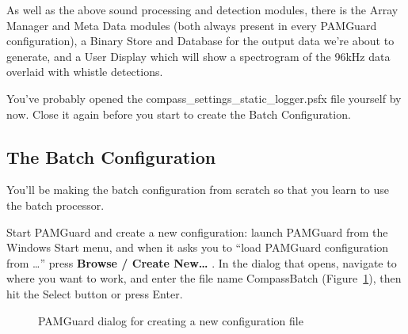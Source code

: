 \documentclass[
]{article}
\begin{document}
As well as the above sound processing and detection modules, there is
the Array Manager and Meta Data modules (both always present in every
PAMGuard configuration), a Binary Store and Database for the output data
we're about to generate, and a User Display which will show a
spectrogram of the 96kHz data overlaid with whistle detections.

You've probably opened the compass\_settings\_static\_logger.psfx file
yourself by now. Close it again before you start to create the Batch
Configuration.

\subsection{The Batch Configuration}\label{the-batch-configuration}

You'll be making the batch configuration from scratch so that you learn
to use the batch processor.

Start PAMGuard and create a new configuration: launch PAMGuard from the
Windows Start menu, and when it asks you to ``load PAMGuard
configuration from \ldots{}'' press \textbf{Browse / Create New\ldots{}}
. In the dialog that opens, navigate to where you want to work, and
enter the file name CompassBatch (Figure~\ref{fig-createpsfx}), then hit
the Select button or press Enter.

\begin{figure}


\caption{\label{fig-createpsfx}PAMGuard dialog for creating a new
configuration file}

\end{figure}%
\end{document}
